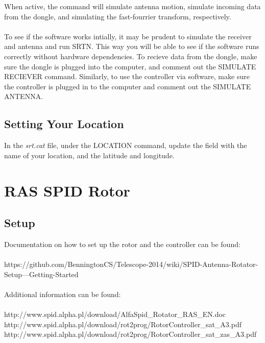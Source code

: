 \documentclass[11pt]{article} %
\begin{document}
When active, the command will simulate antenna motion, simulate incoming data from the dongle, and simulating the fast-fourrier transform, respectively. 
\\ \\
To see if the software works intially, it may be prudent to simulate the receiver and antenna and run SRTN. This way you will be able to see if the software runs correctly without hardware dependencies. To recieve data from the dongle, make sure the dongle is plugged into the computer, and comment out the SIMULATE RECIEVER command. Similarly, to use the controller via software, make sure the controller is plugged in to the computer and comment out the SIMULATE ANTENNA.
\vspace{1cm}
\subsection{Setting Your Location}

In the \emph{srt.cat} file, under the LOCATION command, update the field with the name of your location, and the latitude and longitude. 






\newpage
\section{RAS SPID Rotor}

\subsection{Setup}

Documentation on how to set up the rotor and the controller can be found: \\ \\
https://github.com/BenningtonCS/Telescope-2014/wiki/SPID-Antenna-Rotator-Setup---Getting-Started
\\ \\
Additional information can be found: \\ \\
http://www.spid.alpha.pl/download/AlfaSpid\_Rotator\_RAS\_EN.doc \\
http://www.spid.alpha.pl/download/rot2prog/RotorController\_sat\_A3.pdf \\
http://www.spid.alpha.pl/download/rot2prog/RotorController\_sat\_zas\_A3.pdf \\
\end{document}
